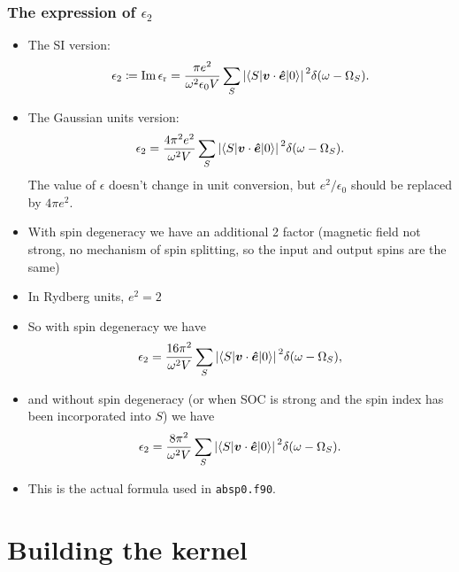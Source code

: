\documentclass[t]{beamer}
\newcommand{\shortcode}[1]{\texttt{#1}}
\begin{document}
\begin{frame}[allowframebreaks]
\frametitle{The expression of $\epsilon_2$}

\begin{itemize}
    \item The SI version: 
    \begin{equation}
        \epsilon_2 \coloneqq \Im \epsilon_{\text{r}} = \frac{\pi e^2}{\omega^2 \epsilon_0 V} 
        \sum_S \abs*{\mel**{S}{\vb*{v} \cdot \vu*{e}}{0}}^2 \delta(\omega - \Omega_S).
    \end{equation}
    \item The Gaussian units version: 
    \begin{equation}
        \epsilon_2 = \frac{4 \pi^2 e^2}{\omega^2  V} 
        \sum_S \abs*{\mel**{S}{\vb*{v} \cdot \vu*{e}}{0}}^2 \delta(\omega - \Omega_S).
    \end{equation}
    The value of $\epsilon$ doesn't change in unit conversion, 
    but $e^2 / \epsilon_0$ should be replaced by $4 \pi e^2$. 
    \item With spin degeneracy we have an additional 2 factor 
    (magnetic field not strong, no mechanism of spin splitting, 
    so the input and output spins are the same)
    \item In Rydberg units, $e^2 = 2$
    \item So with spin degeneracy we have  
    \begin{equation}
        \epsilon_2 = \frac{16 \pi^2 }{\omega^2  V} 
        \sum_S \abs*{\mel**{S}{\vb*{v} \cdot \vu*{e}}{0}}^2 \delta(\omega - \Omega_S),
    \end{equation}
    \item  and without spin degeneracy 
    (or when SOC is strong and the spin index has been incorporated into $S$) we have 
    \begin{equation}
        \epsilon_2 = \frac{8 \pi^2 }{\omega^2  V} 
        \sum_S \abs*{\mel**{S}{\vb*{v} \cdot \vu*{e}}{0}}^2 \delta(\omega - \Omega_S).
    \end{equation}
    \item This is the actual formula used in \shortcode{absp0.f90}.
\end{itemize}

\end{frame}

\section{Building the kernel}
\end{document}
